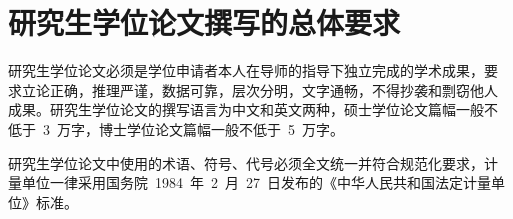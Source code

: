 
\chapter{研究生学位论文撰写的总体要求}
研究生学位论文必须是学位申请者本人在导师的指导下独立完成的学术成果，要
求立论正确，推理严谨，数据可靠，层次分明，文字通畅，不得抄袭和剽窃他人
成果。研究生学位论文的撰写语言为中文和英文两种，硕士学位论文篇幅一般不
低于~3~万字，博士学位论文篇幅一般不低于~5~万字。

研究生学位论文中使用的术语、符号、代号必须全文统一并符合规范化要求，计
量单位一律采用国务院~1984~年~2~月~27~日发布的《中华人民共和国法定计量单
位》标准。


